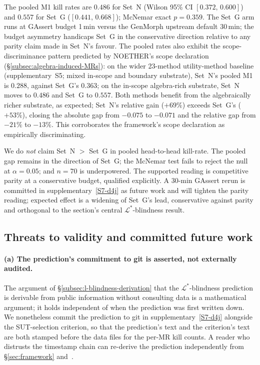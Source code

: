 The pooled M1 kill rates are $0.486$ for Set~N (Wilson 95\% CI
$[0.372,\,0.600]$) and $0.557$ for Set~G ($[0.441,\,0.668]$); McNemar
exact $p = 0.359$. The Set~G arm runs at GAssert budget 1\,min
versus the GenMorph upstream default 30\,min; the budget asymmetry
handicaps Set~G in the conservative direction relative to any parity
claim made in Set~N's favour. The pooled rates also exhibit the
scope-discriminance pattern predicted by NOETHER's scope declaration
(\S\ref{subsec:algebra-induced-MRs}): on the wider 23-method
utility-method baseline (supplementary~S5; mixed in-scope and
boundary substrate), Set~N's pooled M1 is $0.288$, against Set~G's
$0.363$; on the in-scope algebra-rich substrate, Set~N moves to
$0.486$ and Set~G to $0.557$. Both methods benefit from the
algebraically richer substrate, as expected; Set~N's relative gain
($+69\%$) exceeds Set~G's ($+53\%$), closing the absolute gap from
$-0.075$ to $-0.071$ and the relative gap from $-21\%$ to $-13\%$.
This corroborates the framework's scope declaration as empirically
discriminating.

We do \emph{not} claim Set~N $>$ Set~G in pooled head-to-head
kill-rate. The pooled gap remains in the direction of Set~G; the
McNemar test fails to reject the null at $\alpha = 0.05$; and
$n = 70$ is underpowered. The supported reading is competitive parity
at a conservative budget, qualified explicitly. A 30-min GAssert
rerun is committed in supplementary~\ref{S7-d4j} as future work and
will tighten the parity reading; expected effect is a widening of
Set~G's lead, conservative against parity and orthogonal to the
section's central $\mathcal{L}^{*}$-blindness result.

\subsection{Threats to validity and committed future work}
\label{subsec:empirical-threats}

\paragraph{(a) The prediction's commitment to git is asserted, not externally audited.}
The argument of
\S\ref{subsec:l-blindness-derivation} that the
$\mathcal{L}^{*}$-blindness prediction is derivable from public
information without consulting data is a mathematical argument; it
holds independent of when the prediction was first written down. We
nonetheless commit the prediction to git in
supplementary~\ref{S7-d4j} alongside the SUT-selection criterion, so
that the prediction's text and the criterion's text are both stamped
before the data files for the per-MR kill counts. A reader who
distrusts the timestamp chain can re-derive the prediction
independently from \S\ref{sec:framework} and~\cite{Coles2016PIT}.


